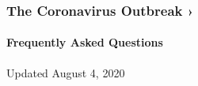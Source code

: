 \href{https://www.nytimes3xbfgragh.onion/news-event/coronavirus?action=click\&pgtype=Article\&state=default\&region=MAIN_CONTENT_3\&context=storylines_faq}{}

\hypertarget{the-coronavirus-outbreak-}{%
\subsubsection{The Coronavirus Outbreak
›}\label{the-coronavirus-outbreak-}}

\hypertarget{frequently-asked-questions}{%
\paragraph{Frequently Asked
Questions}\label{frequently-asked-questions}}

Updated August 4, 2020

